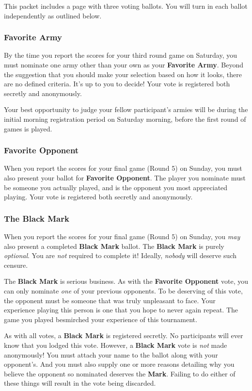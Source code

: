 \documentclass[10pt,titlepage]{article}
\begin{document}
This packet includes a page with three voting ballots. You will turn in each ballot independently as outlined below.

\subsubsection*{Favorite Army}

By the time you report the scores for your third round game on Saturday, you must nominate one army other than your own as your \textbf{Favorite Army}. Beyond the suggestion that you should make your selection based on how it looks, there are no defined criteria. It's up to you to decide! Your vote is registered both secretly and anonymously.

Your best opportunity to judge your fellow participant's armies will be during the initial morning registration period on Saturday morning, before the first round of games is played.

\subsubsection*{Favorite Opponent}

When you report the scores for your final game (Round 5) on Sunday, you must also present your ballot for \textbf{Favorite Opponent}. The player you nominate must be someone you actually played, and is the opponent you most appreciated playing. Your vote is registered both secretly and anonymously.

\subsubsection*{The Black Mark}

When you report the scores for your final game (Round 5) on Sunday, you \textit{may} also present a completed \textbf{Black Mark} ballot. The \textbf{Black Mark} is purely \textit{optional}. You are \textit{not} required to complete it! Ideally, \textit{nobody} will deserve such censure.

The \textbf{Black Mark} is serious business. As with the \textbf{Favorite Opponent} vote, you can only nominate \textit{one} of your previous opponents. To be deserving of this vote, the opponent must be someone that was truly unpleasant to face. Your experience playing this person is one that you hope to never again repeat. The game you played besmirched your experience of this tournament.

As with all votes, a \textbf{Black Mark} is registered secretly. No participants will ever know that you lodged this vote. However, a \textbf{Black Mark} vote is \textit{not} made anonymously! You must attach your name to the ballot along with your opponent's. And you must also supply one or more reasons detailing why you believe the opponent so nominated deserves the \textbf{Mark}. Failing to do either of these things will result in the vote being discarded.
\end{document}
